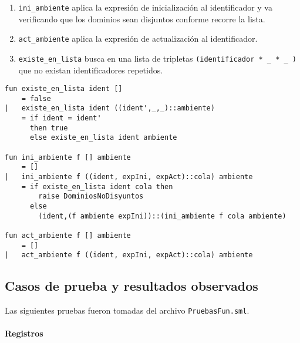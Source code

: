 \documentclass[12pt, times]{simauth}
\begin{document}
\begin{enumerate}
    \item \texttt{ini\_ambiente} aplica la expresión de inicialización al identificador y va verificando que los dominios sean disjuntos conforme recorre la lista.
    \item \texttt{act\_ambiente} aplica la expresión de actualización al identificador.
    \item \texttt{existe\_en\_lista} busca en una lista de tripletas \texttt{(identificador * \_ * \_ )} que no existan identificadores repetidos.
\end{enumerate}


\begin{verbatim}
fun existe_en_lista ident []
    = false
|   existe_en_lista ident ((ident',_,_)::ambiente)
    = if ident = ident' 
      then true
      else existe_en_lista ident ambiente

fun ini_ambiente f [] ambiente
    = []
|   ini_ambiente f ((ident, expIni, expAct)::cola) ambiente    
    = if existe_en_lista ident cola then
        raise DominiosNoDisyuntos
      else
        (ident,(f ambiente expIni))::(ini_ambiente f cola ambiente)

fun act_ambiente f [] ambiente
    = []
|   act_ambiente f ((ident, expIni, expAct)::cola) ambiente    
\end{verbatim}

\subsection{Casos de prueba y resultados observados}

Las siguientes pruebas fueron tomadas del archivo \texttt{PruebasFun.sml}.

\paragraph{Registros}


\end{document}
